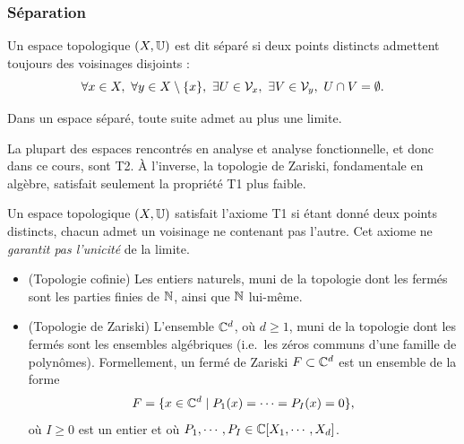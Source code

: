 \subsubsection{Séparation}
\label{subsubsec:separation}

\begin{definition}
\label{def:separe}
%
Un espace topologique $(X, \mathbb{U})$ est dit séparé si deux points distincts admettent toujours des voisinages disjoints : 
\begin{equation}
	\forall x\in X,\ \forall y \in X \setminus \{x\},\ \exists U \in \mathcal{V}_x,\ \exists V \in \mathcal{V}_y,\ U \cap V = \emptyset. 
\end{equation}
\end{definition}

\begin{remark}
\label{rem:uniqueLim}
%
Dans un espace séparé, toute suite admet au plus une limite.	
\end{remark}

La plupart des espaces rencontrés en analyse et analyse fonctionnelle, et donc dans ce cours, sont T2. À l'inverse, la topologie de Zariski, fondamentale en algèbre, satisfait seulement la propriété T1 plus faible.

\begin{remark} %
\label{rem:T1}
%
Un espace topologique $(X, \mathbb{U})$ satisfait l'axiome T1 si étant donné deux points distincts, chacun admet un voisinage ne contenant pas l'autre. 
Cet axiome ne \emph{garantit pas l'unicité} de la limite. 
\end{remark}

\begin{exemple}
\label{ex:T1nonT2}
\begin{itemize}
	\item (Topologie cofinie) Les entiers naturels, muni de la topologie dont les fermés sont les parties finies de $\mathbb{N}$, ainsi que $\mathbb{N}$ lui-même. 
	\item (Topologie de Zariski) L'ensemble $\mathbb{C}^d$, où $d \geq 1$, muni de la topologie dont les fermés sont les ensembles algébriques (i.e.\ les zéros communs d'une famille de polynômes). Formellement, un fermé de Zariski $F \subset \mathbb{C}^d$ est un ensemble de la forme
	\begin{equation}
		F = \{x \in \mathbb{C}^d \mid P_1(x) = \cdots = P_I(x) = 0\},
	\end{equation}
	où $I\geq 0$ est un entier et où $P_1,\cdots,P_I \in \mathbb{C}[X_1,\cdots,X_d]$. 
\end{itemize}
\end{exemple}

